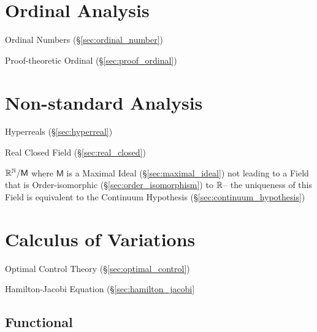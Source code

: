 \section{Ordinal Analysis}\label{sec:ordinal_analysis}

Ordinal Numbers (\S\ref{sec:ordinal_number})

Proof-theoretic Ordinal (\S\ref{sec:proof_ordinal})



\section{Non-standard Analysis}\label{sec:nonstandard_analysis}

Hyperreals (\S\ref{sec:hyperreal})

Real Closed Field (\S\ref{sec:real_closed})

$\mathbb{R}^{\mathbb{N}} / \mathsf{M}$ where $\mathsf{M}$ is a Maximal Ideal
(\S\ref{sec:maximal_ideal}) not leading to a Field that is
Order-isomorphic (\S\ref{sec:order_isomorphism}) to $\mathbb{R}$-- the
uniqueness of this Field is equivalent to the Continuum Hypothesis
(\S\ref{sec:continuum_hypothesis})



\section{Calculus of Variations}\label{sec:calculus_of_variations}

\fist Optimal Control Theory (\S\ref{sec:optimal_control})

Hamilton-Jacobi Equation (\S\ref{sec:hamilton_jacobi}



\subsection{Functional}\label{sec:functional}

